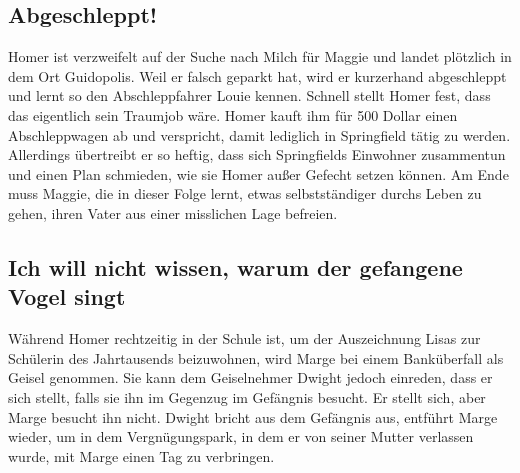 
\subsection{Abgeschleppt!}\label{JABF21}
Homer ist verzweifelt auf der Suche nach Milch für Maggie und landet plötzlich in dem Ort Guidopolis. Weil er falsch geparkt hat, wird er kurzerhand abgeschleppt und lernt so den Abschleppfahrer Louie kennen. Schnell stellt Homer fest, dass das eigentlich sein Traumjob wäre. Homer kauft ihm für 500 Dollar einen Abschleppwagen ab und verspricht, damit lediglich in Springfield tätig zu werden. Allerdings übertreibt er so heftig, dass sich Springfields Einwohner zusammentun und einen Plan schmieden, wie sie Homer außer Gefecht setzen können. Am Ende muss Maggie, die in dieser Folge lernt, etwas selbstständiger durchs Leben zu gehen, ihren Vater aus einer misslichen Lage befreien. 


\subsection{Ich will nicht wissen, warum der gefangene Vogel singt}\label{JABF19}
Während Homer rechtzeitig in der Schule ist, um der Auszeichnung Lisas zur Schülerin des Jahrtausends beizuwohnen, wird Marge bei einem Banküberfall als Geisel genommen. Sie kann dem Geiselnehmer Dwight jedoch einreden, dass er sich stellt, falls sie ihn im Gegenzug im Gefängnis besucht. Er stellt sich, aber Marge besucht ihn nicht. Dwight bricht aus dem Gefängnis aus, entführt Marge wieder, um in dem Vergnügungspark, in dem er von seiner Mutter verlassen wurde, mit Marge einen Tag zu verbringen.

